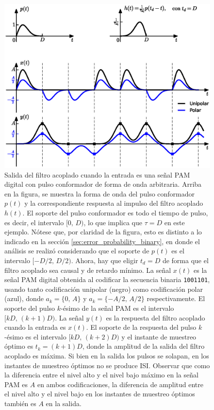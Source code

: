 \documentclass[a4paper]{article}
\begin{document}
\begin{figure}[!htb]
\begin{center}
\includegraphics[width=0.9\columnwidth]{figuras/matched_filter_pam_output.eps}
\caption{\label{fig:matched_filter_pam_output} Salida del filtro acoplado cuando la entrada es una señal PAM digital con pulso conformador de forma de onda arbitraria. Arriba en la figura, se muestra la forma de onda del pulso conformador \(p(t)\) y la correspondiente respuesta al impulso del filtro acoplado \(h(t)\). El soporte del pulso conformador es todo el tiempo de pulso, es decir, el intervalo \([0,\,D)\), lo que implica que \(\tau=D\) en este ejemplo. Nótese que, por claridad de la figura, esto es distinto a lo indicado en la sección \ref{sec:error_probability_binary}, en donde el análisis se realizó considerando que el soporte de \(p(t)\) es el intervalo \([-D/2,\,D/2)\). Ahora, hay que eligir \(t_d=D\) de forma que el filtro acoplado sea causal y de retardo mínimo. La señal \(x(t)\) es la señal PAM digital obtenida al codificar la secuencia binaria \texttt{1001101}, usando tanto codificación unipolar (negro) como codificación polar (azul), donde \(a_k=\lbrace 0,\,A\rbrace\) y \(a_k=\lbrace -A/2,\,A/2\rbrace\) respectivamente. El soporte del pulso \(k\)-ésimo de la señal PAM es el intervalo \([kD,\,(k+1)D)\). La señal \(y(t)\) es la respuesta del filtro acoplado cuando la entrada es \(x(t)\). El soporte de la respuesta del pulso \(k\)-ésimo es el intervalo \([kD,\,(k+2)D)\) y el instante de muestreo óptimo es \(t_k=(k+1)D\), donde la amplitud de la salida del filtro acoplado es máxima. Si bien en la salida los pulsos se solapan, en los instantes de muestreo óptimos no se produce ISI. Observar que como la diferencia entre el nivel alto y el nivel bajo máximo en la señal PAM es \(A\) en ambos codificaciones, la diferencia de amplitud entre el nivel alto y el nivel bajo en los instantes de muestreo óptimos también es \(A\) en la salida.}
\end{center}
\end{figure}
\end{document}
